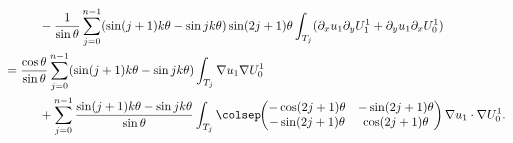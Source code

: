 \begin{align*}
&\hspace*{1cm}-\frac{1}{\sin \theta}\sum_{j=0}^{n-1} (\sin(j+1)k\theta-\sin jk\theta)\sin(2j+1)\theta
\int_{T_j} (\partial_x u_1 \partial_y U_1^1 + \partial_y u_1 \partial_x U_0^1)\\
&= \frac{\cos \theta}{\sin \theta}\sum_{j=0}^{n-1} (\sin(j+1)k\theta-\sin jk\theta) \int_{T_j} \nabla u_1 \nabla U_0^1\\
&\hspace*{1cm}+ \sum_{j=0}^{n-1}\dfrac{\sin(j+1)k\theta-\sin jk\theta}{\sin \theta} \int _{T_j}\colsep\hspace*{-1mm} \begin{pmatrix}
-\cos (2j+1)\theta & -\sin (2j+1) \theta \\
-\sin (2j+1)\theta & \cos (2j+1)\theta
\end{pmatrix}\nabla u_1 \cdot \nabla U_0^1.
\end{align*}
\egroup\newpage

